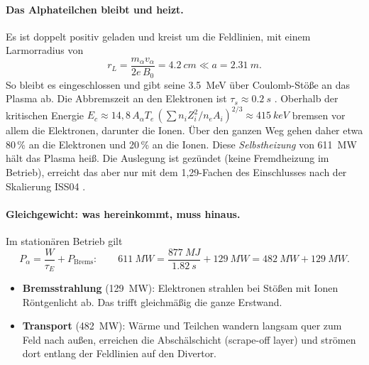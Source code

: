 \paragraph{Das Alphateilchen bleibt und heizt.} Es ist doppelt positiv geladen und kreist um die Feldlinien, mit einem
Larmorradius von
\[ r_L = \frac{m_\alpha v_\alpha}{2e\,B_0} = \SI{4,2}{cm} \ll a = \SI{2,31}{m}. \]
So bleibt es eingeschlossen und gibt seine \SI{3,5}{MeV} über Coulomb-Stöße an das Plasma ab. Die Abbremszeit an den
Elektronen ist $\tau_s \approx \SI{0,2}{s}$ \cite{stix1972}. Oberhalb der kritischen Energie
$E_c \approx 14{,}8\,A_\alpha T_e\,(\sum n_i Z_i^2/n_e A_i)^{2/3} \approx \SI{415}{keV}$ bremsen vor allem die
Elektronen, darunter die Ionen. Über den ganzen Weg gehen daher etwa 80\,\% an die Elektronen und 20\,\% an die
Ionen. Diese \emph{Selbstheizung} von \SI{611}{MW} hält das Plasma heiß. Die Auslegung ist gezündet (keine
Fremdheizung im Betrieb), erreicht das aber nur mit dem 1,29-Fachen des Einschlusses nach der Skalierung ISS04
\cite{yamada2005}.

\paragraph{Gleichgewicht: was hereinkommt, muss hinaus.} Im stationären Betrieb gilt
\[ P_\alpha = \frac{W}{\tau_E} + P_\mathrm{Brems}:\qquad
   \SI{611}{MW} = \frac{\SI{877}{MJ}}{\SI{1,82}{s}} + \SI{129}{MW} = \SI{482}{MW} + \SI{129}{MW}. \]
\begin{itemize}
\item \textbf{Bremsstrahlung} (\SI{129}{MW}): Elektronen strahlen bei Stößen mit Ionen Röntgenlicht ab. Das trifft
  gleichmäßig die ganze Erstwand.
\item \textbf{Transport} (\SI{482}{MW}): Wärme und Teilchen wandern langsam quer zum Feld nach außen, erreichen die
  Abschälschicht (scrape-off layer) und strömen dort entlang der Feldlinien auf den Divertor.
\end{itemize}



